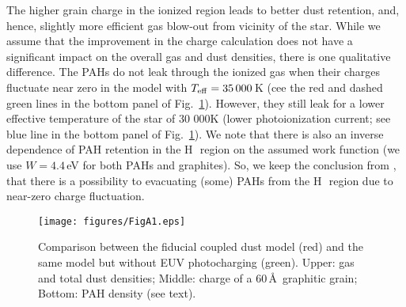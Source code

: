 \documentclass[a4paper,fleqn,usenatbib]{mnras}
\newcommand{\hii}    {H\,{\sc{ii}}~}
\begin{document}
The higher grain charge in the ionized region leads to better dust retention, and, hence, slightly more efficient gas blow-out from vicinity of the star. While we assume that the improvement in the charge calculation  does not have a significant impact on the overall gas and dust densities, there is one qualitative difference. The PAHs do not leak through the ionized gas when their charges fluctuate near zero in the model with $T_{\rm eff}=35\,000$\,K (cee the red and dashed green lines in the bottom panel of Fig.~\ref{FigA1}). However, they still leak for a lower effective temperature of the star of 30 000K (lower photoionization current; see blue line in the bottom panel of Fig.~\ref{FigA1}). We note that there is also an inverse dependence of PAH retention in the \hii region on the assumed work function (we use $W=4.4$\,eV for both PAHs and graphites). So, we keep the conclusion from , that there is a possibility to evacuating (some) PAHs from the \hii region due to near-zero charge fluctuation.

\begin{figure}
\centering
\texttt{[image: figures/FigA1.eps]}
\caption{Comparison between the fiducial coupled dust model (red) and the same model but without EUV photocharging (green). Upper: gas and total dust densities; Middle: charge of a $60$\,\AA~graphitic grain; Bottom: PAH density (see text).}
\label{FigA1}
\end{figure}

\bsp	%
\label{lastpage}
\end{document}
